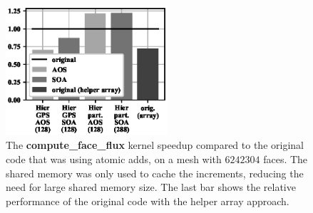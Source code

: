 
\begin{figure}[Htbp]
  \centering
  \includegraphics[width=6cm]{fig/mini_aero_speedup_nocache.eps}
  \caption{The \textbf{compute\_face\_flux} kernel speedup compared to the
  original code that was using atomic adds, on a mesh with
  $6242304$ faces. The shared memory was only used to cache the increments,
  reducing the need for large shared memory size. The last bar shows the
  relative performance of the original code with the helper array approach.}
  \label{fig:mini_aero_speedup_small-cache}
\end{figure}

